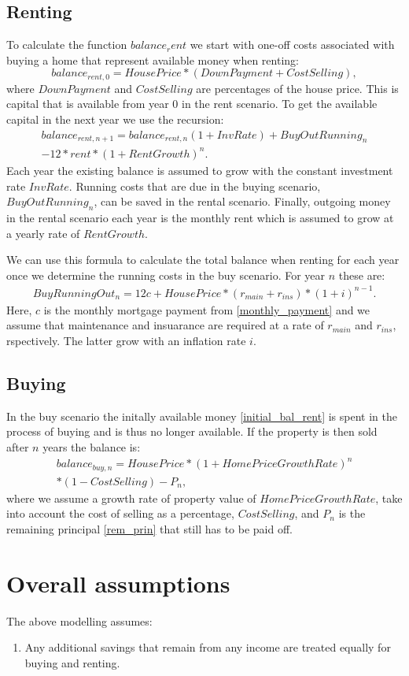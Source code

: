 \documentclass{article}
\begin{document}
\subsection{Renting}
To calculate the function $balance_rent$ we start with one-off costs associated with buying a home that represent available money when renting:
\begin{equation}
	\label{initial_bal_rent}
	balance_{rent, 0} = HousePrice*(DownPayment + CostSelling),
\end{equation}
where $DownPayment$ and $CostSelling$ are percentages of the house price. This is capital that is available from year $0$ in the rent scenario. To get the available capital in the next year we use the recursion:
\begin{multline}
	balance_{rent, n+1} = balance_{rent, n}(1 + InvRate) + BuyOutRunning_n \\
	- 12*rent*(1 + RentGrowth)^n.
\end{multline}
Each year the existing balance is assumed to grow with the constant investment rate $InvRate$. Running costs that are due in the buying scenario, $BuyOutRunning_n$, can be saved in the rental scenario. Finally, outgoing money in the rental scenario each year is the monthly rent which is assumed to grow at a yearly rate of $RentGrowth$.

We can use this formula to calculate the total balance when renting for each year once we determine the running costs in the buy scenario. For year $n$ these are:
\begin{multline}
	BuyRunningOut_n = 12c + HousePrice*(r_{main} + r_{ins})*(1 + i)^{n-1}.
\end{multline}
Here, $c$ is the monthly mortgage payment from \eqref{monthly_payment} and we assume that maintenance and insuarance are required at a rate of $r_{main}$ and $r_{ins}$, rspectively. The latter grow with an inflation rate $i$.

\subsection{Buying}
In the buy scenario the initally available money \eqref{initial_bal_rent} is spent in the process of buying and is thus no longer available. If the property is then sold after $n$ years the balance is:
\begin{multline}
	balance_{buy, n} = HousePrice*(1+HomePriceGrowthRate)^n \\
	*(1-CostSelling) - P_n,
\end{multline}
where we assume a growth rate of property value of $HomePriceGrowthRate$, take into account the cost of selling as a percentage, $CostSelling$, and $P_n$ is the remaining principal \eqref{rem_prin} that still has to be paid off.

\section{Overall assumptions}
The above modelling assumes:
\begin{enumerate}
	\item Any additional savings that remain from any income are treated equally for buying and renting.
\end{enumerate}
\end{document}
